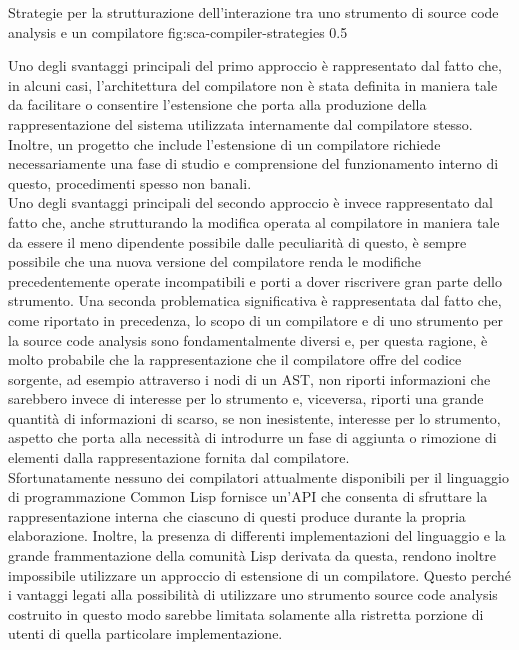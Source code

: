       {Strategie per la strutturazione dell'interazione tra uno strumento di
      source code analysis e un compilatore}
      {fig:sca-compiler-strategies}
      {0.5}

Uno degli svantaggi principali del primo approccio è rappresentato dal fatto
che, in alcuni casi, l'architettura del compilatore non è stata definita in
maniera tale da facilitare o consentire l'estensione che porta alla produzione
della rappresentazione del sistema utilizzata internamente dal compilatore
stesso. Inoltre, un progetto che include l'estensione di un compilatore
richiede necessariamente una fase di studio e comprensione del funzionamento
interno di questo, procedimenti spesso non banali.\\

Uno degli svantaggi principali del secondo approccio è invece rappresentato dal
fatto che, anche strutturando la modifica operata al compilatore in maniera
tale da essere il meno dipendente possibile dalle peculiarità di questo, è
sempre possibile che una nuova versione del compilatore renda le modifiche
precedentemente operate incompatibili e porti a dover riscrivere gran parte
dello strumento. Una seconda problematica significativa è rappresentata dal
fatto che, come riportato in precedenza, lo scopo di un compilatore e di uno
strumento per la source code analysis sono fondamentalmente diversi e, per
questa ragione, è molto probabile che la rappresentazione che il compilatore
offre del codice sorgente, ad esempio attraverso i nodi di un AST, non riporti
informazioni che sarebbero invece di interesse per lo strumento e, viceversa,
riporti una grande quantità di informazioni di scarso, se non inesistente,
interesse per lo strumento, aspetto che porta alla necessità di introdurre un
fase di aggiunta o rimozione di elementi dalla rappresentazione fornita dal
compilatore.\\

Sfortunatamente nessuno dei compilatori attualmente disponibili per il
linguaggio di programmazione Common Lisp fornisce un'API che consenta di
sfruttare la rappresentazione interna che ciascuno di questi produce durante la
propria elaborazione. Inoltre, la presenza di differenti implementazioni del
linguaggio e la grande frammentazione della comunità Lisp derivata da questa,
rendono inoltre impossibile utilizzare un approccio di estensione di un
compilatore. Questo perché i vantaggi legati alla possibilità di utilizzare uno
strumento source code analysis costruito in questo modo sarebbe limitata
solamente alla ristretta porzione di utenti di quella particolare
implementazione.

